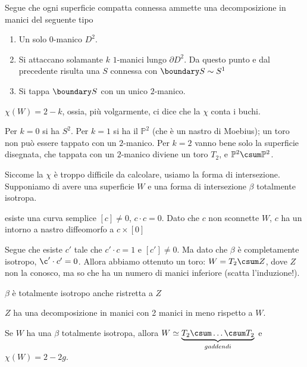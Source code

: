 Segue che ogni superficie compatta connessa ammette una decomposizione in manici del seguente tipo
\begin{enumerate}
 \item Un solo $0$-manico $D^2$.
 \item Si attaccano solamante $k$ $1$-manici lungo $\partial D^2$. Da questo punto e dal precedente risulta una $S$ connessa con $\boundary S \sim S^1$
 \item Si tappa $\boundary S$ con un unico $2$-manico.
\end{enumerate}
\begin{oss}
 $\chi(W) = 2-k$, ossia, più volgarmente, ci dice che la $\chi$ conta i buchi.
\end{oss}
\begin{es}
 Per $k=0$ si ha $S^2$. Per $k=1$ si ha il $\mathbb P^2$ (che è un nastro di Moebius); un toro non può essere tappato con un $2$-manico.
 Per $k=2$ vanno bene solo la superficie disegnata, che tappata con un $2$-manico diviene un toro $T_2$, e $\mathbb P^2 \csum \mathbb P ^2$.
\end{es}

Siccome la $\chi$ è troppo difficile da calcolare, usiamo la forma di intersezione. 
Supponiamo di avere una superficie $W$ e una forma di intersezione $\beta$ totalmente isotropa.
\begin{oss}
 esiste una curva semplice $\left [ c\right ]\neq 0$, $c\cdot c = 0$. Dato che $c$ non sconnette $W$, $c$ ha un intorno a nastro diffeomorfo a $c \times \left[ 0 \right ]$
\end{oss}
Segue che esiste $c'$ tale che $c'\cdot c = 1$ e $\left [ c' \right ]\neq 0$. Ma dato che $\beta$ è completamente isotropo, $\c' \cdot c'= 0$.
Allora abbiamo ottenuto un toro: $W = T_2\csum Z$, dove $Z$ non la conosco, ma so che ha un numero di manici inferiore (scatta l'induzione!).
\begin{oss}
 $\beta$ è totalmente isotropo anche ristretta a $Z$
\end{oss}
\begin{oss}
 $Z$ ha una decomposizione in manici con 2 manici in meno rispetto a $W$.
\end{oss}
\begin{teo}
 Se $W$ ha una $\beta$ totalmente isotropa, allora $W\simeq \underbrace {T_2\csum \dots \csum T_2}_{g addendi}$ e $\chi (W) = 2 - 2g$.
\end{teo}

